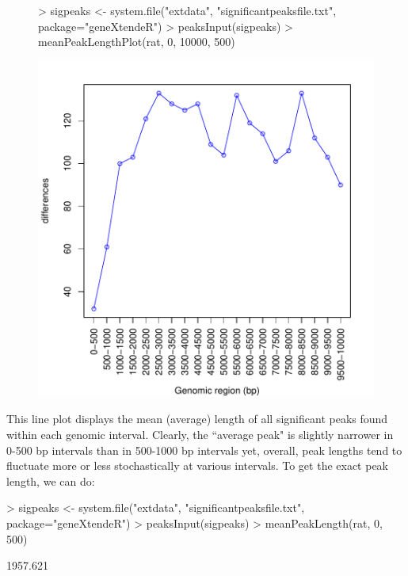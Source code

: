 \documentclass[12pt]{article}
\begin{document}
\begin{figure}[H]
\begin{center}
\begin{Schunk}
\begin{Sinput}
> sigpeaks <- system.file("extdata", "significantpeaksfile.txt", package="geneXtendeR")
> peaksInput(sigpeaks)
> meanPeakLengthPlot(rat, 0, 10000, 500)
\end{Sinput}
\end{Schunk}
\includegraphics{geneXtendeR-012}
\end{center}
\end{figure}

This line plot displays the mean (average) length of all significant peaks found within each genomic interval.  Clearly, the ``average peak" is slightly narrower in 0-500 bp intervals than in 500-1000 bp intervals yet, overall, peak lengths tend to fluctuate more or less stochastically at various intervals.  To get the exact peak length, we can do:

\begin{Schunk}
\begin{Sinput}
> sigpeaks <- system.file("extdata", "significantpeaksfile.txt", package="geneXtendeR")
> peaksInput(sigpeaks)
> meanPeakLength(rat, 0, 500)
\end{Sinput}
\begin{Soutput}
[1] 1957.621
\end{Soutput}
\end{Schunk}
\end{document}
